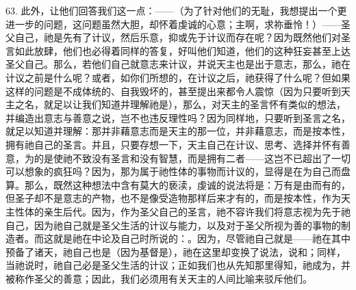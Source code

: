 63. 此外，让他们回答我们这一点：——（为了针对他们的无耻，我想提出一个更进一步的问题，这问题虽然大胆，却怀着虔诚的心意；主啊，求祢垂怜！）——圣父自己，祂是先有了计议，然后乐意，抑或先于计议而存在呢？因为既然他们对圣言如此放肆，他们也必得着同样的答复，好叫他们知道，他们的这种狂妄甚至上达圣父自己。那么，若他们自己就意志来计议，并说天主也是出于意志，那么，祂在计议之前是什么呢？或者，如你们所想的，在计议之后，祂获得了什么呢？但如果这样的问题是不成体统的、自我毁坏的，甚至提出来都令人震惊（因为只要听到天主之名，就足以让我们知道并理解祂是），那么，对天主的圣言怀有类似的想法，并编造出意志与善意之说，岂不也违反理性吗？因为同样地，只要听到圣言之名，就足以知道并理解：那并非藉意志而是天主的那一位，并非藉意志，而是按本性，拥有祂自己的圣言。并且，只要存想一下，天主自己在计议、思考、选择并怀有善意，为的是使祂不致没有圣言和没有智慧，而是拥有二者——这岂不已超出了一切可以想象的疯狂吗？因为，那为属于祂性体的事物而计议的，显得是在为自己而盘算。那么，既然这种想法中含有莫大的亵渎，虔诚的说法将是：万有是由而有的，但圣子却不是意志的产物，也不是像受造物那样后来才有的，而是按本性，作为天主性体的亲生后代。因为，作为圣父自己的圣言，祂不容许我们将意志视为先于祂自己，因为祂自己就是圣父生活的计议与能力，以及对于圣父所视为善的事物的制造者。而这就是祂在中论及自己时所说的：。因为，尽管祂自己就是——祂在其中预备了诸天，祂自己也是（因为基督是），祂在这里却变换了说法，说和；同样，当祂说时，祂自己必是圣父生活的计议；正如我们也从先知那里得知，祂成为，并被称作圣父的善意；因此，我们必须用有关天主的人间比喻来驳斥他们。\par

